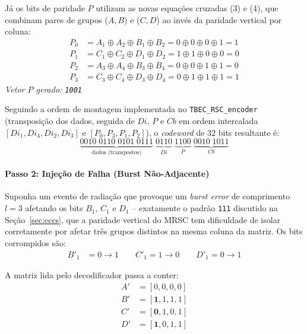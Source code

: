 \documentclass[12pt,a4paper]{article}
\begin{document}
Já os bits de paridade $P$ utilizam as novas equações cruzadas (3) e (4), 
que combinam pares de grupos ($A,B$) e ($C,D$) ao invés da paridade vertical 
por coluna:
\begin{align*}
    P_0 &= A_1 \oplus A_2 \oplus B_1 \oplus B_2 = 0 \oplus 0 \oplus 0 \oplus 1 = 1 \\
    P_1 &= C_1 \oplus C_2 \oplus D_1 \oplus D_2 = 1 \oplus 1 \oplus 0 \oplus 0 = 0 \\
    P_2 &= A_3 \oplus A_4 \oplus B_3 \oplus B_4 = 0 \oplus 0 \oplus 1 \oplus 1 = 0 \\
    P_3 &= C_3 \oplus C_4 \oplus D_3 \oplus D_4 = 0 \oplus 1 \oplus 1 \oplus 1 = 1
\end{align*}
\textit{Vetor $P$ gerado: \texttt{1001}}

Seguindo a ordem de montagem implementada no \texttt{TBEC\_RSC\_encoder} 
(transposição dos dados, seguida de $Di$, $P$ e $Cb$ em ordem intercalada 
$[Di_1,Di_4,Di_2,Di_3]$ e $[P_0,P_3,P_1,P_2]$), o \textit{codeword} de 32 
bits resultante é:
\begin{equation*}
    \underbrace{0010\;0110\;0101\;0111}_{\text{dados (transpostos)}}\;
    \underbrace{0110}_{Di}\;\underbrace{1100}_{P}\;
    \underbrace{0010\;1011}_{Cb}
\end{equation*}

\paragraph{Passo 2: Injeção de Falha (Burst Não-Adjacente)}

Suponha um evento de radiação que provoque um \textit{burst error} de 
comprimento $l=3$ afetando os bits $B_1$, $C_1$ e $D_1$ -- exatamente o 
padrão \texttt{111} discutido na Seção~\ref{sec:eccs}, que a paridade 
vertical do MRSC tem dificuldade de isolar corretamente por afetar três 
grupos distintos na mesma coluna da matriz. Os bits corrompidos são:
\begin{align*}
    B'_1 &= 0 \rightarrow 1 \qquad C'_1 = 1 \rightarrow 0 \qquad D'_1 = 0 \rightarrow 1
\end{align*}

A matriz lida pelo decodificador passa a conter:
\begin{align*}
    A' &= [0, 0, 0, 0] \\
    B' &= [\mathbf{1}, 1, 1, 1] \\
    C' &= [\mathbf{0}, 1, 0, 1] \\
    D' &= [\mathbf{1}, 0, 1, 1]
\end{align*}
\end{document}
